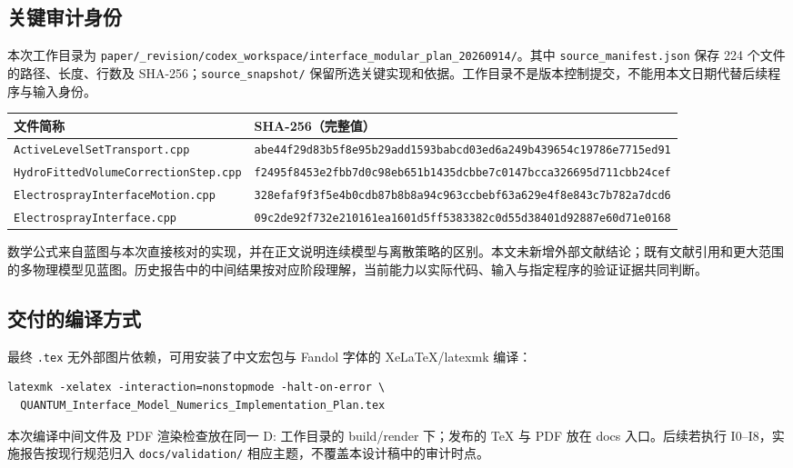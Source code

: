 \documentclass[UTF8,a4paper,11pt,fontset=fandol]{ctexart}
\newcommand{\code}[1]{\nolinkurl{#1}}
\begin{document}
\subsection{关键审计身份}
本次工作目录为 \code{paper/_revision/codex_workspace/interface_modular_plan_20260914/}。其中 \code{source_manifest.json} 保存 224 个文件的路径、长度、行数及 SHA-256；\code{source_snapshot/} 保留所选关键实现和依据。工作目录不是版本控制提交，不能用本文日期代替后续程序与输入身份。
\begin{longtable}{@{}P{.34\textwidth}P{.60\textwidth}@{}}
\toprule 文件简称 & SHA-256（完整值）\\\midrule\endhead
\code{ActiveLevelSetTransport.cpp} & \code{abe44f29d83b5f8e95b29add1593babcd03ed6a249b439654c19786e7715ed91}\\
\code{HydroFittedVolumeCorrectionStep.cpp} & \code{f2495f8453e2fbb7d0c98eb651b1435dcbbe7c0147bcca326695d711cbb24cef}\\
\code{ElectrosprayInterfaceMotion.cpp} & \code{328efaf9f3f5e4b0cdb87b8b8a94c963ccbebf63a629e4f8e843c7b782a7dcd6}\\
\code{ElectrosprayInterface.cpp} & \code{09c2de92f732e210161ea1601d5ff5383382c0d55d38401d92887e60d71e0168}\\
\bottomrule
\end{longtable}
数学公式来自蓝图与本次直接核对的实现，并在正文说明连续模型与离散策略的区别。本文未新增外部文献结论；既有文献引用和更大范围的多物理模型见蓝图。历史报告中的中间结果按对应阶段理解，当前能力以实际代码、输入与指定程序的验证证据共同判断。

\subsection{交付的编译方式}
最终 \texttt{.tex} 无外部图片依赖，可用安装了中文宏包与 Fandol 字体的 XeLaTeX/latexmk 编译：
\begin{lstlisting}
latexmk -xelatex -interaction=nonstopmode -halt-on-error \
  QUANTUM_Interface_Model_Numerics_Implementation_Plan.tex
\end{lstlisting}
本次编译中间文件及 PDF 渲染检查放在同一 D: 工作目录的 build/render 下；发布的 TeX 与 PDF 放在 docs 入口。后续若执行 I0--I8，实施报告按现行规范归入 \code{docs/validation/} 相应主题，不覆盖本设计稿中的审计时点。
\end{document}
